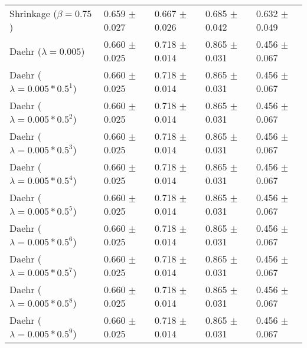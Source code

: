 \begin{table}
\begin{tabular}{*{5}{l}}
Shrinkage ($\beta=0.75$)&0.659 $\pm$ 0.027&0.667 $\pm$ 0.026&0.685 $\pm$ 0.042&0.632 $\pm$ 0.049\\
Daehr ($\lambda=0.005$)&0.660 $\pm$ 0.025&0.718 $\pm$ 0.014&0.865 $\pm$ 0.031&0.456 $\pm$ 0.067\\
Daehr ($\lambda=0.005*0.5^1$)&0.660 $\pm$ 0.025&0.718 $\pm$ 0.014&0.865 $\pm$ 0.031&0.456 $\pm$ 0.067\\
Daehr ($\lambda=0.005*0.5^2$)&0.660 $\pm$ 0.025&0.718 $\pm$ 0.014&0.865 $\pm$ 0.031&0.456 $\pm$ 0.067\\
Daehr ($\lambda=0.005*0.5^3$)&0.660 $\pm$ 0.025&0.718 $\pm$ 0.014&0.865 $\pm$ 0.031&0.456 $\pm$ 0.067\\
Daehr ($\lambda=0.005*0.5^4$)&0.660 $\pm$ 0.025&0.718 $\pm$ 0.014&0.865 $\pm$ 0.031&0.456 $\pm$ 0.067\\
Daehr ($\lambda=0.005*0.5^5$)&0.660 $\pm$ 0.025&0.718 $\pm$ 0.014&0.865 $\pm$ 0.031&0.456 $\pm$ 0.067\\
Daehr ($\lambda=0.005*0.5^6$)&0.660 $\pm$ 0.025&0.718 $\pm$ 0.014&0.865 $\pm$ 0.031&0.456 $\pm$ 0.067\\
Daehr ($\lambda=0.005*0.5^7$)&0.660 $\pm$ 0.025&0.718 $\pm$ 0.014&0.865 $\pm$ 0.031&0.456 $\pm$ 0.067\\
Daehr ($\lambda=0.005*0.5^8$)&0.660 $\pm$ 0.025&0.718 $\pm$ 0.014&0.865 $\pm$ 0.031&0.456 $\pm$ 0.067\\
Daehr ($\lambda=0.005*0.5^9$)&0.660 $\pm$ 0.025&0.718 $\pm$ 0.014&0.865 $\pm$ 0.031&0.456 $\pm$ 0.067\\
\bottomrule
\end{tabular}
\end{table}

